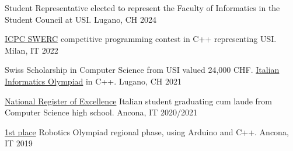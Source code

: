 
\begin{cvhonors}
    
  \cvhonor
    {Student Representative} %
    {elected to represent the Faculty of Informatics
    in the Student Council at USI.} %
    {Lugano, CH} %
    {2024} %
    
  \cvhonor
    {\href{https://swerc.eu/2022/teams/}{ICPC SWERC}} %
    {competitive programming contest in C++ representing USI.} %
    {Milan, IT} %
    {2022} %
    
  \cvhonor
    {Swiss Scholarship in Computer Science} %
    {from USI valued 24,000 CHF. 
    \href{https://www.olimpiadi-informatica.it/index.php/selezione-territoriale-20.html}{%
    Italian Informatics Olympiad} in C++.} %
    {Lugano, CH} %
    {2021} %
    
  \cvhonor
    {\href{https://www.indire.it/eccellenze/}{National Register of Excellence}} %
    {Italian student graduating cum laude from Computer Science high school.} %
    {Ancona, IT} %
    {2020/2021} %
    
  \cvhonor
    {\href{https://www.makerslab.it/olimpiadi-robotiche-ancona-2019/}{1st place}} %
    {Robotics Olympiad regional phase, using Arduino and C++.} %
    {Ancona, IT} %
    {2019} %
    
\end{cvhonors}
